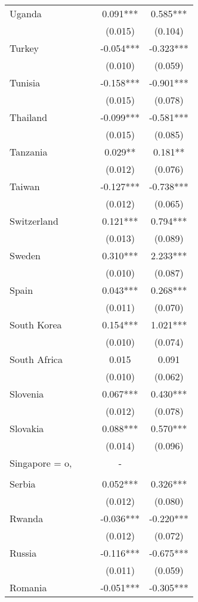 \documentclass[]{article}
\begin{document}
\begin{tabular}{lcccc}
Uganda &  &  & 0.091*** & 0.585*** \\
 &  &  & (0.015) & (0.104) \\
Turkey &  &  & -0.054*** & -0.323*** \\
 &  &  & (0.010) & (0.059) \\
Tunisia &  &  & -0.158*** & -0.901*** \\
 &  &  & (0.015) & (0.078) \\
Thailand &  &  & -0.099*** & -0.581*** \\
 &  &  & (0.015) & (0.085) \\
Tanzania &  &  & 0.029** & 0.181** \\
 &  &  & (0.012) & (0.076) \\
Taiwan &  &  & -0.127*** & -0.738*** \\
 &  &  & (0.012) & (0.065) \\
Switzerland &  &  & 0.121*** & 0.794*** \\
 &  &  & (0.013) & (0.089) \\
Sweden &  &  & 0.310*** & 2.233*** \\
 &  &  & (0.010) & (0.087) \\
Spain &  &  & 0.043*** & 0.268*** \\
 &  &  & (0.011) & (0.070) \\
South Korea &  &  & 0.154*** & 1.021*** \\
 &  &  & (0.010) & (0.074) \\
South Africa &  &  & 0.015 & 0.091 \\
 &  &  & (0.010) & (0.062) \\
Slovenia &  &  & 0.067*** & 0.430*** \\
 &  &  & (0.012) & (0.078) \\
Slovakia &  &  & 0.088*** & 0.570*** \\
 &  &  & (0.014) & (0.096) \\
Singapore = o, &  &  & - &  \\
 &  &  &  &  \\
Serbia &  &  & 0.052*** & 0.326*** \\
 &  &  & (0.012) & (0.080) \\
Rwanda &  &  & -0.036*** & -0.220*** \\
 &  &  & (0.012) & (0.072) \\
Russia &  &  & -0.116*** & -0.675*** \\
 &  &  & (0.011) & (0.059) \\
Romania &  &  & -0.051*** & -0.305*** \\

\end{tabular}
\end{document}
